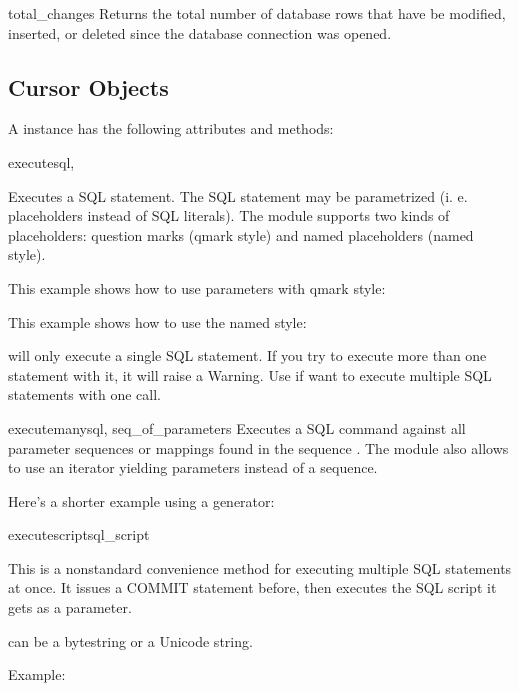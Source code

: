 \begin{memberdesc}{total_changes}
  Returns the total number of database rows that have be modified, inserted,
  or deleted since the database connection was opened.
\end{memberdesc}





\subsection{Cursor Objects \label{sqlite3-Cursor-Objects}}

A  instance has the following attributes and methods:

\begin{methoddesc}{execute}{sql, }

Executes a SQL statement. The SQL statement may be parametrized (i. e.
placeholders instead of SQL literals). The  module supports two kinds of
placeholders: question marks (qmark style) and named placeholders (named
style).

This example shows how to use parameters with qmark style:

    

This example shows how to use the named style:

    

     will only execute a single SQL statement. If you try to
    execute more than one statement with it, it will raise a Warning. Use
     if want to execute multiple SQL statements with one
    call.
\end{methoddesc}


\begin{methoddesc}{executemany}{sql, seq_of_parameters}
Executes a SQL command against all parameter sequences or mappings found in the
sequence . The  module also allows
to use an iterator yielding parameters instead of a sequence.



Here's a shorter example using a generator:


\end{methoddesc}

\begin{methoddesc}{executescript}{sql_script}

This is a nonstandard convenience method for executing multiple SQL statements
at once. It issues a COMMIT statement before, then executes the SQL script it
gets as a parameter.

 can be a bytestring or a Unicode string.

Example:


\end{methoddesc}

